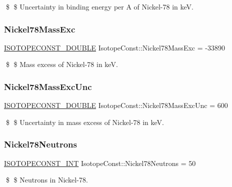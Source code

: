 \$ \$ Uncertainty in binding energy per A of Nickel-\/78 in keV. \mbox{\label{group___isotope_const-_nickel-_ni78_gac82f7a3aa11893659454182c42c65b58}} 
\subsubsection{\texorpdfstring{Nickel78\+Mass\+Exc}{Nickel78MassExc}}
{\footnotesize\ttfamily \mbox{\hyperlink{group___isotope_const-_macros_ga8f45a7272ce02c0b4c65c44636ed719a}{I\+S\+O\+T\+O\+P\+E\+C\+O\+N\+S\+T\+\_\+\+D\+O\+U\+B\+LE}} Isotope\+Const\+::\+Nickel78\+Mass\+Exc = -\/33890}

\$ \$ Mass excess of Nickel-\/78 in keV. \mbox{\label{group___isotope_const-_nickel-_ni78_ga93ab393195a3d96587290bedb4c25361}} 
\subsubsection{\texorpdfstring{Nickel78\+Mass\+Exc\+Unc}{Nickel78MassExcUnc}}
{\footnotesize\ttfamily \mbox{\hyperlink{group___isotope_const-_macros_ga8f45a7272ce02c0b4c65c44636ed719a}{I\+S\+O\+T\+O\+P\+E\+C\+O\+N\+S\+T\+\_\+\+D\+O\+U\+B\+LE}} Isotope\+Const\+::\+Nickel78\+Mass\+Exc\+Unc = 600}

\$ \$ Uncertainty in mass excess of Nickel-\/78 in keV. \mbox{\label{group___isotope_const-_nickel-_ni78_gae19d356ee40909258acacac74939f230}} 
\subsubsection{\texorpdfstring{Nickel78\+Neutrons}{Nickel78Neutrons}}
{\footnotesize\ttfamily \mbox{\hyperlink{group___isotope_const-_macros_ga5f18360b3e99483a35c32d789e62621c}{I\+S\+O\+T\+O\+P\+E\+C\+O\+N\+S\+T\+\_\+\+I\+NT}} Isotope\+Const\+::\+Nickel78\+Neutrons = 50}

\$ \$ Neutrons in Nickel-\/78. \mbox{\label{group___isotope_const-_nickel-_ni78_ga709f13cf0d38096035fb73ae944dbaae}} 

